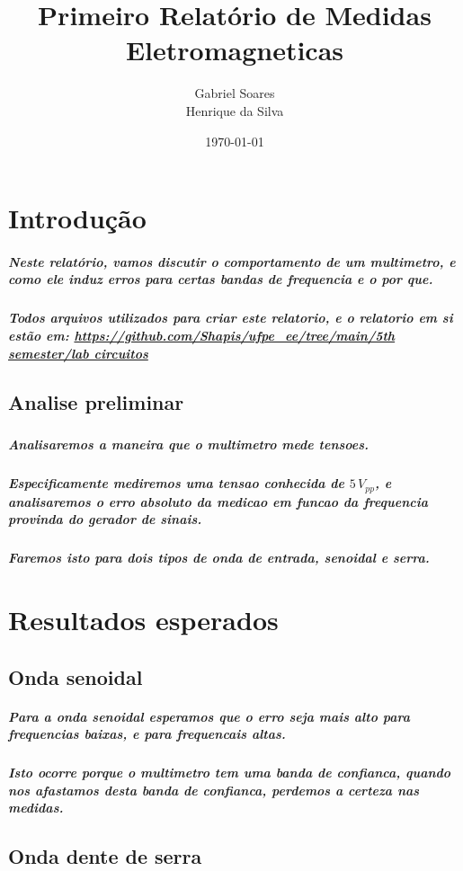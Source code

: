 \documentclass[12pt,twoside, a4paper, twocolumn]{article}
\title{Primeiro Relatório de Medidas Eletromagneticas}
\author{Gabriel Soares \\ Henrique da Silva}
\date{\today}
\begin{document}
\maketitle
{}
\newpage
\tableofcontents
\newpage



\section{Introdução}


\subparagraph*{Neste relatório, vamos discutir o comportamento de um multimetro, e como ele induz erros para certas bandas de frequencia e o por que.}

\subparagraph*{Todos arquivos utilizados para criar este relatorio, e o relatorio em si estão em:  \url{https://github.com/Shapis/ufpe_ee/tree/main/5th semester/lab circuitos}}




\subsection{Analise preliminar}
\subparagraph*{}


\subparagraph*{Analisaremos a maneira que o multimetro mede tensoes.}

\subparagraph*{Especificamente mediremos uma tensao conhecida de $5\,V_{pp}$, e analisaremos o erro absoluto da medicao em funcao da frequencia provinda do gerador de sinais.}

\subparagraph*{Faremos isto para dois tipos de onda de entrada, senoidal e serra.}

\section*{Resultados esperados}

\subsection*{Onda senoidal}

\subparagraph*{Para a onda  senoidal esperamos que o erro seja mais alto para frequencias baixas, e para frequencais altas.}

\subparagraph*{Isto ocorre porque o multimetro tem uma banda de confianca, quando nos afastamos desta banda de confianca, perdemos a certeza nas medidas.}

\subsection*{Onda dente de serra}
\end{document}
